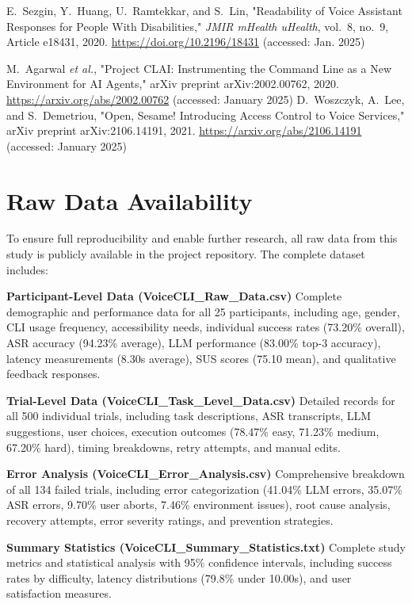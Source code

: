\documentclass[a4paper,12pt]{article}
\begin{document}
\begin{thebibliography}{30}
 E.~Sezgin, Y.~Huang, U.~Ramtekkar, and S.~Lin, "Readability of Voice Assistant Responses for People With Disabilities," \textit{JMIR mHealth uHealth}, vol.~8, no.~9, Article e18431, 2020. \url{https://doi.org/10.2196/18431} (accessed: Jan. 2025)

 M.~Agarwal \textit{et al.}, "Project CLAI: Instrumenting the Command Line as a New Environment for AI Agents," arXiv preprint arXiv:2002.00762, 2020. \url{https://arxiv.org/abs/2002.00762} (accessed: January 2025)
 D.~Woszczyk, A.~Lee, and S.~Demetriou, "Open, Sesame! Introducing Access Control to Voice Services," arXiv preprint arXiv:2106.14191, 2021. \url{https://arxiv.org/abs/2106.14191} (accessed: January 2025)

\end{thebibliography}

\clearpage

\section*{Raw Data Availability}
\noindent To ensure full reproducibility and enable further research, all raw data from this study is publicly available in the project repository. The complete dataset includes:

\textbf{Participant-Level Data (VoiceCLI\_Raw\_Data.csv)} Complete demographic and performance data for all 25 participants, including age, gender, CLI usage frequency, accessibility needs, individual success rates (73.20\% overall), ASR accuracy (94.23\% average), LLM performance (83.00\% top-3 accuracy), latency measurements (8.30s average), SUS scores (75.10 mean), and qualitative feedback responses.

\textbf{Trial-Level Data (VoiceCLI\_Task\_Level\_Data.csv)} Detailed records for all 500 individual trials, including task descriptions, ASR transcripts, LLM suggestions, user choices, execution outcomes (78.47\% easy, 71.23\% medium, 67.20\% hard), timing breakdowns, retry attempts, and manual edits.

\textbf{Error Analysis (VoiceCLI\_Error\_Analysis.csv)} Comprehensive breakdown of all 134 failed trials, including error categorization (41.04\% LLM errors, 35.07\% ASR errors, 9.70\% user aborts, 7.46\% environment issues), root cause analysis, recovery attempts, error severity ratings, and prevention strategies.

\textbf{Summary Statistics (VoiceCLI\_Summary\_Statistics.txt)} Complete study metrics and statistical analysis with 95\% confidence intervals, including success rates by difficulty, latency distributions (79.8\% under 10.00s), and user satisfaction measures.
\end{document}
